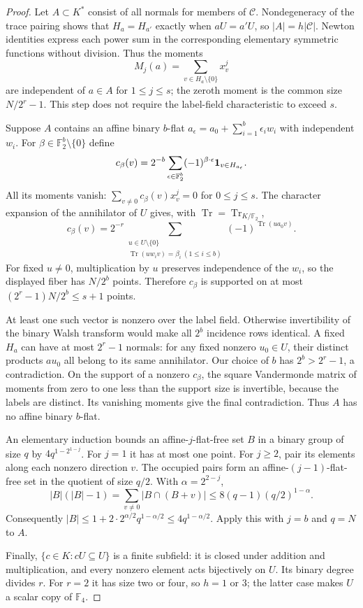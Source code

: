 \begin{proof}
Let $A\subset K^*$ consist of all normals for members of
$\mathcal C$. Nondegeneracy of the trace pairing shows that
$H_a=H_{a'}$ exactly when $aU=a'U$, so $|A|=h|\mathcal C|$.
Newton identities express each power sum in the corresponding
elementary symmetric functions without division. Thus the moments
\[
 M_j(a)=\sum_{v\in H_a\setminus\{0\}}x_v^j
\]
are independent of $a\in A$ for $1\le j\le s$; the zeroth
moment is the common size $N/2^r-1$. This step does not require
the label-field characteristic to exceed $s$.

Suppose $A$ contains an affine binary $b$-flat
$a_\epsilon=a_0+\sum_{i=1}^b\epsilon_i w_i$ with independent $w_i$.
For $\beta\in\mathbb F_2^b\setminus\{0\}$ define
\[
 c_\beta(v)=2^{-b}\sum_{\epsilon\in\mathbb F_2^b}
       (-1)^{\beta\cdot\epsilon}{\bf1}_{v\in H_{a_\epsilon}}.
\]
All its moments vanish: $\sum_{v\ne0}c_\beta(v)x_v^j=0$ for
$0\le j\le s$. The character expansion of the annihilator of $U$
gives, with $\operatorname{Tr}=\operatorname{Tr}_{K/\mathbb F_2}$,
\[
 c_\beta(v)=2^{-r}
 \sum_{\substack{u\in U\setminus\{0\}\\
          \operatorname{Tr}(uw_iv)=\beta_i\ (1\le i\le b)}}
             (-1)^{\operatorname{Tr}(ua_0v)}.
\]
For fixed $u\ne0$, multiplication by $u$ preserves independence
of the $w_i$, so the displayed fiber has $N/2^b$ points. Therefore
$c_\beta$ is supported on at most $(2^r-1)N/2^b\le s+1$ points.

At least one such vector is nonzero over the label field. Otherwise
invertibility of the binary Walsh transform would make all $2^b$
incidence rows identical. A fixed $H_a$ can have at most $2^r-1$
normals: for any fixed nonzero $u_0\in U$, their distinct products
$au_0$ all belong to its same annihilator. Our choice of $b$ has
$2^b>2^r-1$, a contradiction. On the support of a nonzero $c_\beta$,
the square Vandermonde matrix of moments from zero to one less than
the support size is invertible, because the labels are distinct.
Its vanishing moments give the final contradiction. Thus $A$ has
no affine binary $b$-flat.

An elementary induction bounds an affine-$j$-flat-free set $B$ in a
binary group of size $q$ by $4q^{1-2^{1-j}}$. For $j=1$ it has at
most one point. For $j\ge2$, pair its elements along each nonzero
direction $v$. The occupied pairs form an affine-$(j-1)$-flat-free
set in the quotient of size $q/2$. With $\alpha=2^{2-j}$,
\[
 |B|(|B|-1)=\sum_{v\ne0}|B\cap(B+v)|
       \le8(q-1)(q/2)^{1-\alpha}.
\]
Consequently $|B|\le1+2\cdot2^{\alpha/2}q^{1-\alpha/2}
\le4q^{1-\alpha/2}$. Apply this with $j=b$ and $q=N$ to $A$.

Finally, $\{c\in K:cU\subseteq U\}$ is a finite subfield:
it is closed under addition and multiplication, and every nonzero
element acts bijectively on $U$. Its binary degree divides $r$.
For $r=2$ it has size two or four, so $h=1$ or $3$; the latter
case makes $U$ a scalar copy of $\mathbb F_4$.
\end{proof}

